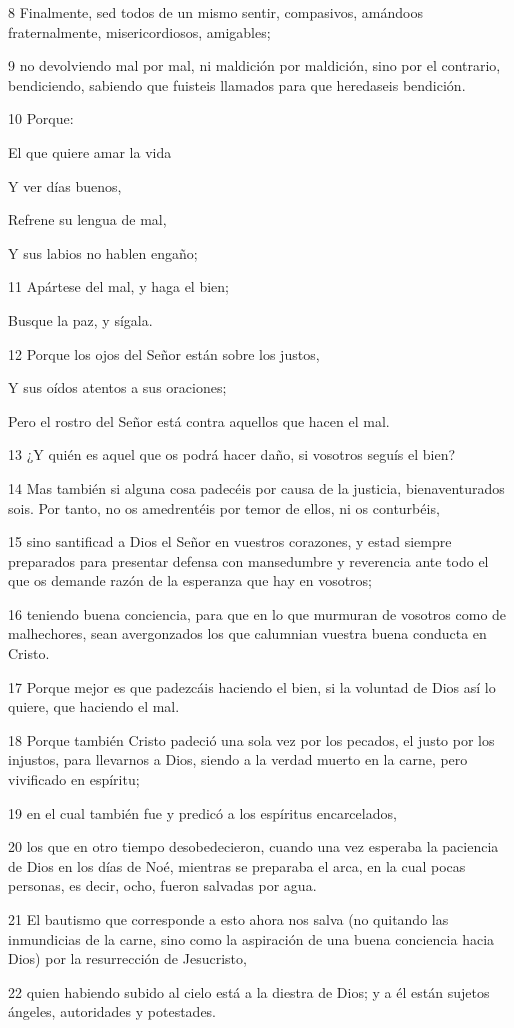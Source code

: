 \par 8 Finalmente, sed todos de un mismo sentir, compasivos, amándoos fraternalmente, misericordiosos, amigables;
\par 9 no devolviendo mal por mal, ni maldición por maldición, sino por el contrario, bendiciendo, sabiendo que fuisteis llamados para que heredaseis bendición.
\par 10 Porque:
\par El que quiere amar la vida
\par Y ver días buenos,
\par Refrene su lengua de mal,
\par Y sus labios no hablen engaño;
\par 11 Apártese del mal, y haga el bien;
\par Busque la paz, y sígala.
\par 12 Porque los ojos del Señor están sobre los justos,
\par Y sus oídos atentos a sus oraciones;
\par Pero el rostro del Señor está contra aquellos que hacen el mal.
\par 13 ¿Y quién es aquel que os podrá hacer daño, si vosotros seguís el bien?
\par 14 Mas también si alguna cosa padecéis por causa de la justicia, bienaventurados sois. Por tanto, no os amedrentéis por temor de ellos, ni os conturbéis,
\par 15 sino santificad a Dios el Señor en vuestros corazones, y estad siempre preparados para presentar defensa con mansedumbre y reverencia ante todo el que os demande razón de la esperanza que hay en vosotros;
\par 16 teniendo buena conciencia, para que en lo que murmuran de vosotros como de malhechores, sean avergonzados los que calumnian vuestra buena conducta en Cristo.
\par 17 Porque mejor es que padezcáis haciendo el bien, si la voluntad de Dios así lo quiere, que haciendo el mal.
\par 18 Porque también Cristo padeció una sola vez por los pecados, el justo por los injustos, para llevarnos a Dios, siendo a la verdad muerto en la carne, pero vivificado en espíritu;
\par 19 en el cual también fue y predicó a los espíritus encarcelados,
\par 20 los que en otro tiempo desobedecieron, cuando una vez esperaba la paciencia de Dios en los días de Noé, mientras se preparaba el arca, en la cual pocas personas, es decir, ocho, fueron salvadas por agua.
\par 21 El bautismo que corresponde a esto ahora nos salva (no quitando las inmundicias de la carne, sino como la aspiración de una buena conciencia hacia Dios) por la resurrección de Jesucristo,
\par 22 quien habiendo subido al cielo está a la diestra de Dios; y a él están sujetos ángeles, autoridades y potestades.

